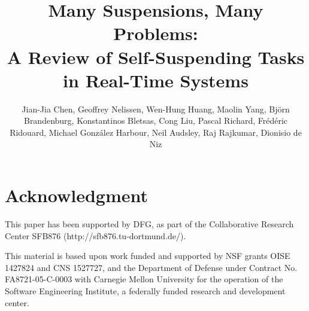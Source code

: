 



\papertrue 



\title{Many Suspensions, Many Problems:\\
A Review of Self-Suspending Tasks in Real-Time Systems}
\author{Jian-Jia Chen, Geoffrey Nelissen, Wen-Hung
  Huang, Maolin Yang, Bj\"orn Brandenburg,
  Konstantinos Bletsas, Cong Liu, Pascal
  Richard, Fr\'ed\'eric Ridouard, Michael Gonz\'alez
  Harbour, Neil Audsley,  Raj Rajkumar, Dionisio de Niz}

\maketitle  
 
 









\section*{Acknowledgment}

This paper has been supported by DFG, as part of the Collaborative
Research Center SFB876 (http://sfb876.tu-dortmund.de/).

This material is based upon work funded and supported by NSF grants OISE 1427824 and CNS 1527727, and the Department of Defense under Contract No. FA8721-05-C-0003 with Carnegie Mellon University for the operation of the Software Engineering Institute, a federally funded research and development center.

